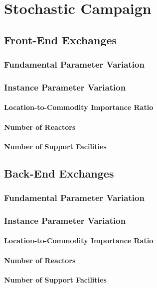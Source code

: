 
\section{Stochastic Campaign}\label{results:stochastic}

\subsection{Front-End Exchanges}

\subsubsection{Fundamental Parameter Variation}

\subsubsection{Instance Parameter Variation}

\paragraph{Location-to-Commodity Importance Ratio}

\paragraph{Number of Reactors}

\paragraph{Number of Support Facilities}

\subsection{Back-End Exchanges}

\subsubsection{Fundamental Parameter Variation}

\subsubsection{Instance Parameter Variation}

\paragraph{Location-to-Commodity Importance Ratio}

\paragraph{Number of Reactors}

\paragraph{Number of Support Facilities}
